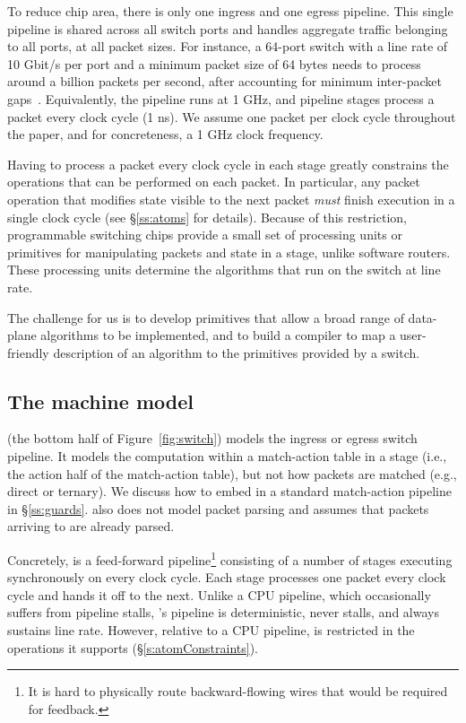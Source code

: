 To reduce chip area, there is only one ingress and one egress pipeline.  This
single pipeline is shared across all switch ports and handles aggregate traffic
belonging to all ports, at all packet sizes.  For instance, a 64-port switch
with a line rate of 10 Gbit/s per port and a minimum packet size of 64 bytes
needs to process around a billion packets per second, after accounting for
minimum inter-packet gaps~\cite{rmt}.  Equivalently, the pipeline runs at 1
GHz, and pipeline stages process a packet every clock cycle (1 ns).  We assume
one packet per clock cycle throughout the paper, and for concreteness, a
1 GHz clock frequency.

Having to process a packet every clock cycle in each stage greatly constrains
the operations that can be performed on each packet. In particular, any packet
operation that modifies state visible to the next packet {\em must} finish
execution in a single clock cycle (see \S\ref{ss:atoms} for details). Because
of this restriction, programmable switching chips provide a small set of
processing units or primitives for manipulating packets and state in a stage,
unlike software routers. These processing units determine the algorithms that
run on the switch at line rate.

The challenge for us is to develop primitives that allow a broad range of
data-plane algorithms to be implemented, and to build a compiler to map a
user-friendly description of an algorithm to the primitives provided by a
switch.

\subsection{The \absmachine machine model}

\absmachine (the bottom half of Figure~\ref{fig:switch}) models
the ingress or egress switch pipeline.  It models the
computation within a match-action table in a stage (i.e., the action half of
the match-action table), but not how packets are matched (e.g., direct or
ternary). We discuss how to embed \absmachine in a standard match-action
pipeline in \S\ref{ss:guards}.  \absmachine also does not model packet parsing and assumes
that packets arriving to \absmachine are already parsed.

 Concretely, \absmachine is a feed-forward pipeline\footnote{It is hard to
physically route backward-flowing wires that would be required for feedback.}
consisting of a number of stages executing synchronously on every clock cycle.
Each stage processes one packet every clock cycle and hands it off to the next.
Unlike a CPU pipeline, which occasionally suffers from pipeline stalls,
\absmachine's pipeline is deterministic, never stalls, and always sustains line
rate. However, relative to a CPU pipeline, \absmachine is restricted in the
operations it supports (\S\ref{s:atomConstraints}).


